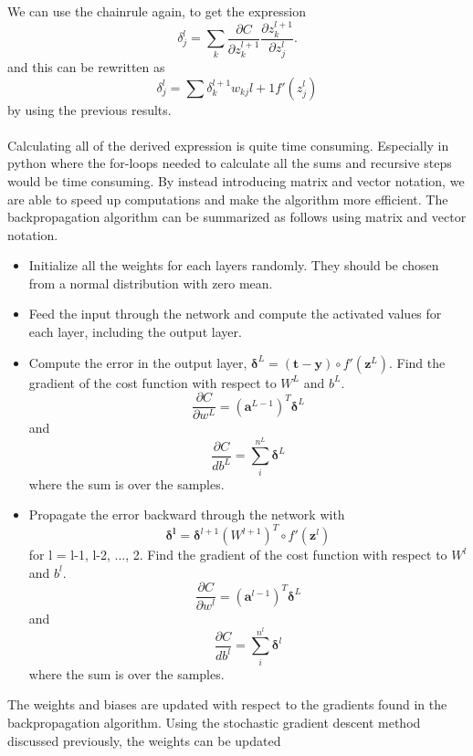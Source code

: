We can use the chainrule again, to get the expression
\begin{equation}
    \delta_j^l = \sum_k \frac{\partial C}{\partial z_k^{l+1}} \frac{\partial z_k^{l+1}}{\partial z_j^l}.
\end{equation}
and this can be rewritten as
\begin{equation}
    \delta_j^l = \sum \delta_k^{l+1}w_{kj}{l+1}f'(z_j^l)
\end{equation}
by using the previous results.
\\
\\
Calculating all of the derived expression is quite time consuming. Especially in python where the for-loops needed to calculate all the sums and recursive steps would be time consuming. By instead introducing matrix and vector notation, we are able to speed up computations and make the algorithm more efficient. 
The backpropagation algorithm can be summarized as follows using matrix and vector notation. 
\begin{itemize}
    \item Initialize all the weights for each layers randomly. They should be chosen from a normal distribution with zero mean. 
    \item Feed the input through the network and compute the activated values for each layer, including the output layer. 
    \item Compute the error in the output layer,  $\boldsymbol{\delta}^L = (\boldsymbol{t - y})\circ f'(\boldsymbol{z}^L)$. Find the gradient of the cost function with respect to $W^L$ and $b^L$. $$\frac{\partial C}{\partial w^L} = (\boldsymbol{a}^{L-1})^T\boldsymbol{\delta}^L $$ and $$\frac{\partial C}{db^L} = \sum_i^{n^L} \boldsymbol{\delta}^L$$ where the sum is over the samples. 
    \item Propagate the error backward through the network with
    \begin{equation}
        \boldsymbol{\delta^l} = \boldsymbol{\delta}^{l+1}(W^{l+1})^T\circ f'(\boldsymbol{z}^l)
    \end{equation}
     for l = l-1, l-2, ..., 2.
     Find the gradient of the cost function with respect to $W^{l}$ and $b^{l}$. $$\frac{\partial C}{\partial w^l} = (\boldsymbol{a}^{l-1})^T\boldsymbol{\delta}^L $$ and $$\frac{\partial C}{db^l} = \sum_i^{n^l} \boldsymbol{\delta}^l$$ where the sum is over the samples. 
\end{itemize}
The weights and biases are updated with respect to the gradients found in the backpropagation algorithm. Using the stochastic gradient descent method discussed previously, the weights can be updated
